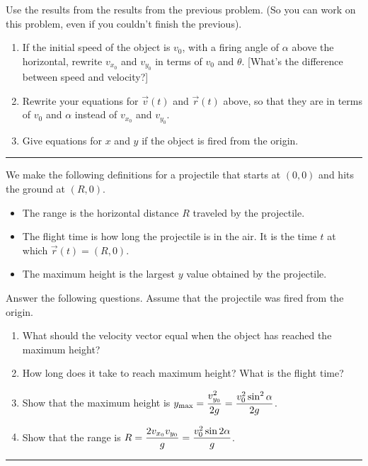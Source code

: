 \begin{problem}\label{projectile formulas from origin}
Use the results from the results from the previous problem. (So you can work on this problem, even if you couldn't finish the previous).
\begin{enumerate}
 \item If the initial speed of the object is $v_0$, with a firing angle of $\alpha$ above the horizontal, rewrite $v_{x_0}$ and $v_{y_0}$ in terms of $v_0$ and $\theta$. [What's the difference between speed and velocity?]
 \item Rewrite your equations for $\vec v(t)$ and $\vec r(t)$ above, so that they are in terms of $v_0$ and $\alpha$ instead of $v_{x_0}$ and $v_{y_0}$.
 \item Give equations for $x$ and $y$ if the object is fired from the origin. 
\end{enumerate}
\hrule\end{problem}
 
We make the following definitions for a projectile that starts at $(0,0)$ and hits the ground at $(R,0)$.
\begin{itemize}
 \item The range is the horizontal distance $R$ traveled by the projectile.  
 \item The flight time is how long the projectile is in the air. It is the time $t$ at which $\vec r(t)=(R,0)$.
 \item The maximum height is the largest $y$ value obtained by the projectile. 
\end{itemize}


\begin{problem}
 Answer the following questions. Assume that the projectile was fired from the origin.
\begin{enumerate}
 \item What should the velocity vector equal when the object has reached the maximum height?
 \item How long does it take to reach maximum height? What is the flight time?
 \item Show that the maximum height is $\displaystyle y_{\max}=\frac{v_{y_0}^2}{2g}=\frac{v_0^2\sin^2\alpha}{2g}$.
 \item Show that the range is $\displaystyle R=\frac{2v_{x_0}v_{y_0}}{g}=\frac{v_0^2\sin2\alpha}{g}$. 
\end{enumerate}
\hrule\end{problem}


